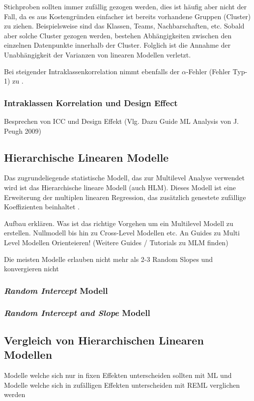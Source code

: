 \documentclass[12pt]{article}\usepackage[]{graphicx}\usepackage[]{color}
\begin{document}
Stichproben sollten immer zufällig gezogen werden, dies ist häufig aber nicht der Fall, da es aus Kostengründen einfacher ist bereits vorhandene Gruppen (Cluster) zu ziehen. Beispielsweise sind das Klassen, Teams, Nachbarschaften, etc. Sobald aber solche Cluster gezogen werden, bestehen Abhängigkeiten zwischen den einzelnen Datenpunkte innerhalb der Cluster. Folglich ist die Annahme der Unabhängigkeit der Varianzen von linearen Modellen verletzt.

Bei steigender Intraklassenkorrelation nimmt ebenfalls der $\alpha$-Fehler (Fehler Typ-1) zu \cite{dorman2008effect}.

\subsubsection{Intraklassen Korrelation und Design Effect}
Besprechen von ICC und Design Effekt (Vlg. Dazu Guide ML Analysis von J. Peugh 2009)


\subsection{Hierarchische Linearen Modelle}
Das zugrundeliegende statistische Modell, das zur Multilevel Analyse verwendet wird ist das Hierarchische lineare Modell (auch HLM). Dieses Modell ist eine Erweiterung der multiplen linearen Regression, das zusätzlich genestete zufällige Koeffizienten beinhaltet \cite{SnijdersTomA.B2012Ma:a}.

Aufbau erklären. Was ist das richtige Vorgehen um ein Multilevel Modell zu erstellen. Nullmodell bis hin zu Cross-Level Modellen etc. An Guides zu Multi Level Modellen Orienteieren! \cite{SnijdersTomA.B2012Ma:a} (Weitere Guides / Tutorials zu MLM finden)

Die meisten Modelle erlauben nicht mehr als 2-3 Random Slopes und konvergieren nicht \cite{SnijdersTomA.B2012Ma:a}

\subsubsection{\textit{Random Intercept} Modell}
\subsubsection{\textit{Random Intercept and Slope} Modell}

\subsection{Vergleich von Hierarchischen Linearen Modellen}
Modelle welche sich nur in fixen Effekten unterscheiden sollten mit ML und Modelle welche sich in zufälligen Effekten unterscheiden mit REML verglichen werden \cite{SnijdersTomA.B2012Ma:a}
\end{document}
